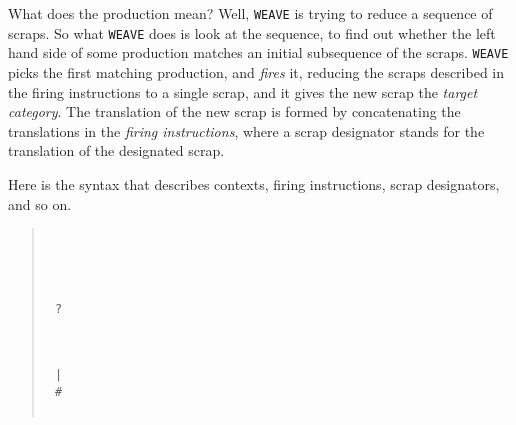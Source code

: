 What does the production mean?
Well, {\tt WEAVE} is trying to reduce a sequence of scraps.
So what {\tt WEAVE} does is look at the sequence, to find out whether
the left hand side of some production matches an initial subsequence
of the scraps.
{\tt WEAVE} picks the first matching production, and {\em fires} it,
reducing the scraps described in the firing instructions to a single
scrap, and it gives the new scrap the {\em target category}.
The translation of the new scrap is formed by concatenating the
translations in the {\em firing instructions}, where a scrap
designator stands for the translation of the designated scrap.

Here is the syntax that describes contexts, firing instructions, scrap
designators, and so on.
\begin{quote}
\tt
{} \produces~\\
 \produces~\\
 \produces {}\\
 \produces {}\\
 \produces~?\\
 \produces~\opt{!}\opt{*}\\
   \produces~\opt{!}\opt{*}\\
   \produces~\\
 \produces~|\\
 \produces~\#\\
 \produces~\\
\end{quote}

